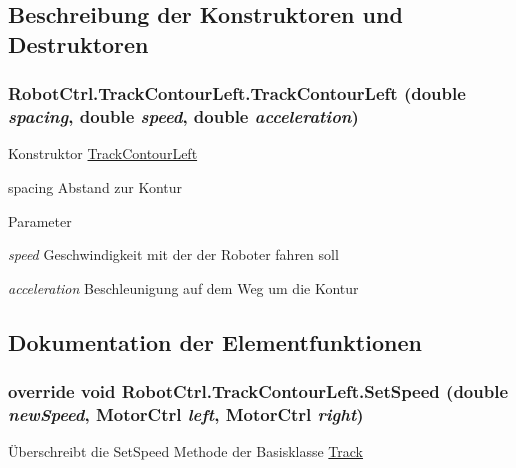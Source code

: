 \subsection{Beschreibung der Konstruktoren und Destruktoren}
\hypertarget{class_robot_ctrl_1_1_track_contour_left_a73c01532abc01420c2a35bea80be194d}{
\subsubsection[{TrackContourLeft}]{\setlength{\rightskip}{0pt plus 5cm}RobotCtrl.TrackContourLeft.TrackContourLeft (double {\em spacing}, \/  double {\em speed}, \/  double {\em acceleration})}}
\label{class_robot_ctrl_1_1_track_contour_left_a73c01532abc01420c2a35bea80be194d}
Konstruktor \hyperlink{class_robot_ctrl_1_1_track_contour_left}{TrackContourLeft}

spacing Abstand zur Kontur 
\begin{DoxyParams}{Parameter}
\item[{\em speed}]Geschwindigkeit mit der der Roboter fahren soll \item[{\em acceleration}]Beschleunigung auf dem Weg um die Kontur \end{DoxyParams}


\subsection{Dokumentation der Elementfunktionen}
\hypertarget{class_robot_ctrl_1_1_track_contour_left_ae7938250af614625cd08a498c0f15195}{
\subsubsection[{SetSpeed}]{\setlength{\rightskip}{0pt plus 5cm}override void RobotCtrl.TrackContourLeft.SetSpeed (double {\em newSpeed}, \/  {\bf MotorCtrl} {\em left}, \/  {\bf MotorCtrl} {\em right})}}
\label{class_robot_ctrl_1_1_track_contour_left_ae7938250af614625cd08a498c0f15195}
\"{U}berschreibt die SetSpeed Methode der Basisklasse \hyperlink{class_robot_ctrl_1_1_track}{Track}



